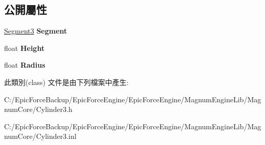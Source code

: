 \subsection*{公開屬性}
\begin{DoxyCompactItemize}
\item 
\hyperlink{class_magnum_1_1_segment3}{Segment3} {\bfseries Segment}\hypertarget{class_magnum_1_1_cylinder3_a28e24bdcff3bc48befb8d8999aa4eaf8}{}\label{class_magnum_1_1_cylinder3_a28e24bdcff3bc48befb8d8999aa4eaf8}

\item 
float {\bfseries Height}\hypertarget{class_magnum_1_1_cylinder3_a763e9c392732e13b317470b72440a14b}{}\label{class_magnum_1_1_cylinder3_a763e9c392732e13b317470b72440a14b}

\item 
float {\bfseries Radius}\hypertarget{class_magnum_1_1_cylinder3_a1b48b9417b37fdaa43d3313d2fcb4c07}{}\label{class_magnum_1_1_cylinder3_a1b48b9417b37fdaa43d3313d2fcb4c07}

\end{DoxyCompactItemize}


此類別(class) 文件是由下列檔案中產生\+:\begin{DoxyCompactItemize}
\item 
C\+:/\+Epic\+Force\+Backup/\+Epic\+Force\+Engine/\+Epic\+Force\+Engine/\+Magnum\+Engine\+Lib/\+Magnum\+Core/Cylinder3.\+h\item 
C\+:/\+Epic\+Force\+Backup/\+Epic\+Force\+Engine/\+Epic\+Force\+Engine/\+Magnum\+Engine\+Lib/\+Magnum\+Core/Cylinder3.\+inl\end{DoxyCompactItemize}
